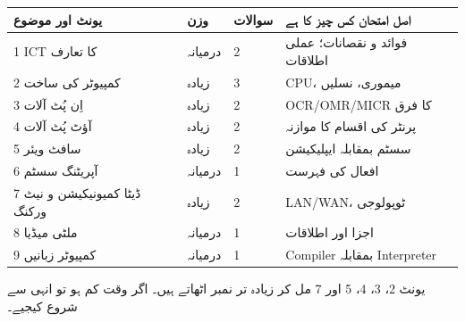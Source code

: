 \medskip
\begin{center}
\begin{tabular}{@{}p{5.0cm} p{1.8cm} p{1.6cm} p{6.0cm}@{}}
\toprule
\textbf{یونٹ اور موضوع} & \textbf{وزن} & \textbf{سوالات} & \textbf{اصل امتحان کس چیز کا ہے} \\
\midrule
\textenglish{1} \textenglish{ICT} کا تعارف        & درمیانہ & \textenglish{2} & فوائد و نقصانات؛ عملی اطلاقات \\
\textenglish{2} کمپیوٹر کی ساخت                    & زیادہ   & \textenglish{3} & \textenglish{CPU}، میموری، نسلیں \\
\textenglish{3} اِن پُٹ آلات                        & زیادہ   & \textenglish{2} & \textenglish{OCR/OMR/MICR} کا فرق \\
\textenglish{4} آؤٹ پُٹ آلات                       & زیادہ   & \textenglish{2} & پرنٹر کی اقسام کا موازنہ \\
\textenglish{5} سافٹ ویئر                          & زیادہ   & \textenglish{2} & سسٹم بمقابلہ ایپلیکیشن \\
\textenglish{6} آپریٹنگ سسٹم                       & درمیانہ & \textenglish{1} & افعال کی فہرست \\
\textenglish{7} ڈیٹا کمیونیکیشن و نیٹ ورکنگ        & زیادہ   & \textenglish{2} & \textenglish{LAN/WAN}، ٹوپولوجی \\
\textenglish{8} ملٹی میڈیا                          & درمیانہ & \textenglish{1} & اجزا اور اطلاقات \\
\textenglish{9} کمپیوٹر زبانیں                      & درمیانہ & \textenglish{1} & \textenglish{Compiler} بمقابلہ \textenglish{Interpreter} \\
\bottomrule
\end{tabular}
\end{center}

\medskip
\noindent
یونٹ \textenglish{2}، \textenglish{3}، \textenglish{4}، \textenglish{5} اور
\textenglish{7} مل کر زیادہ تر نمبر اٹھاتے ہیں۔ اگر وقت کم ہو تو انہی سے شروع
کیجیے۔
